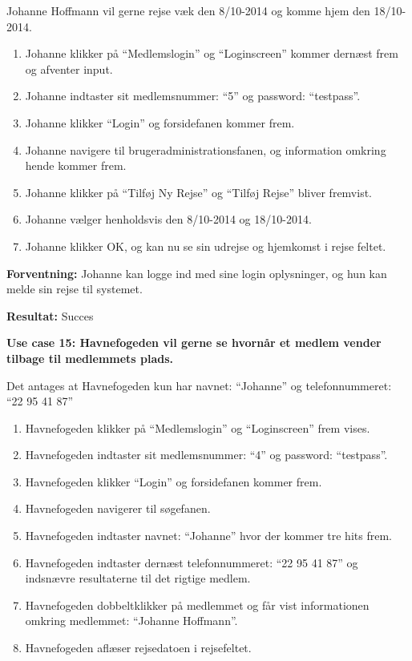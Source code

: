 Johanne Hoffmann vil gerne rejse væk den 8/10-2014 og komme hjem den 18/10-2014.
\begin{enumerate}
	\item Johanne klikker på \enquote{Medlemslogin} og \enquote{Loginscreen} kommer dernæst frem og afventer input.
	\item Johanne indtaster sit medlemsnummer: \enquote{5} og password: \enquote{testpass}.
	\item Johanne klikker \enquote{Login} og forsidefanen kommer frem.
	\item Johanne navigere til brugeradministrationsfanen, og information omkring hende kommer frem.
	\item Johanne klikker på \enquote{Tilføj Ny Rejse} og \enquote{Tilføj Rejse} bliver fremvist.
	\item Johanne vælger henholdsvis den 8/10-2014 og 18/10-2014.
	\item Johanne klikker OK, og kan nu se sin udrejse og hjemkomst i rejse feltet.
\end{enumerate}

\textbf{Forventning:} Johanne kan logge ind med sine login oplysninger, og hun kan melde sin rejse til systemet.

\textbf{Resultat:} Succes


\textbf{Use case 15: Havnefogeden vil gerne se hvornår et medlem vender tilbage til medlemmets plads.}

Det antages at Havnefogeden kun har navnet: \enquote{Johanne} og telefonnummeret: \enquote{22 95 41 87}
\begin{enumerate}
	\item Havnefogeden klikker på \enquote{Medlemslogin} og \enquote{Loginscreen} frem vises.
	\item Havnefogeden indtaster sit medlemsnummer: \enquote{4} og password: \enquote{testpass}.
	\item Havnefogeden klikker \enquote{Login} og forsidefanen kommer frem.
	\item Havnefogeden navigerer til søgefanen.
	\item Havnefogeden indtaster navnet: \enquote{Johanne} hvor der kommer tre hits frem.
	\item Havnefogeden indtaster dernæst telefonnummeret: \enquote{22 95 41 87} og indsnævre resultaterne til det rigtige medlem.
	\item Havnefogeden dobbeltklikker på medlemmet og får vist informationen omkring medlemmet: \enquote{Johanne Hoffmann}.
	\item Havnefogeden aflæser rejsedatoen i rejsefeltet.
\end{enumerate} 

